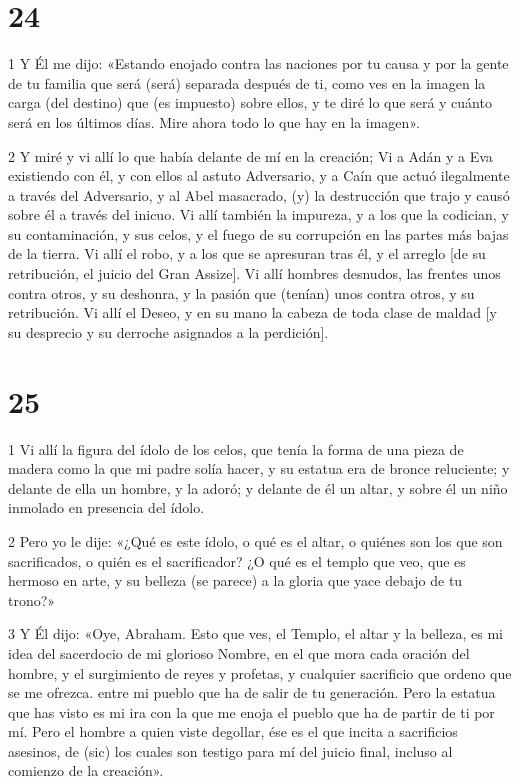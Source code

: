 \chapter{24}

\par 1 Y Él me dijo: «Estando enojado contra las naciones por tu causa y por la gente de tu familia que será (será) separada después de ti, como ves en la imagen la carga (del destino) que (es impuesto) sobre ellos, y te diré lo que será y cuánto será en los últimos días. Mire ahora todo lo que hay en la imagen».

\par 2 Y miré y vi allí lo que había delante de mí en la creación; Vi a Adán y a Eva existiendo con él, y con ellos al astuto Adversario, y a Caín que actuó ilegalmente a través del Adversario, y al Abel masacrado, (y) la destrucción que trajo y causó sobre él a través del inicuo. Vi allí también la impureza, y a los que la codician, y su contaminación, y sus celos, y el fuego de su corrupción en las partes más bajas de la tierra. Vi allí el robo, y a los que se apresuran tras él, y el arreglo [de su retribución, el juicio del Gran Assize]. Vi allí hombres desnudos, las frentes unos contra otros, y su deshonra, y la pasión que (tenían) unos contra otros, y su retribución. Vi allí el Deseo, y en su mano la cabeza de toda clase de maldad [y su desprecio y su derroche asignados a la perdición].

\chapter{25}

\par 1 Vi allí la figura del ídolo de los celos, que tenía la forma de una pieza de madera como la que mi padre solía hacer, y su estatua era de bronce reluciente; y delante de ella un hombre, y la adoró; y delante de él un altar, y sobre él un niño inmolado en presencia del ídolo.

\par 2 Pero yo le dije: «¿Qué es este ídolo, o qué es el altar, o quiénes son los que son sacrificados, o quién es el sacrificador? ¿O qué es el templo que veo, que es hermoso en arte, y su belleza (se parece) a la gloria que yace debajo de tu trono?»

\par 3 Y Él dijo: «Oye, Abraham. Esto que ves, el Templo, el altar y la belleza, es mi idea del sacerdocio de mi glorioso Nombre, en el que mora cada oración del hombre, y el surgimiento de reyes y profetas, y cualquier sacrificio que ordeno que se me ofrezca. entre mi pueblo que ha de salir de tu generación. Pero la estatua que has visto es mi ira con la que me enoja el pueblo que ha de partir de ti por mí. Pero el hombre a quien viste degollar, ése es el que incita a sacrificios asesinos, de (sic) los cuales son testigo para mí del juicio final, incluso al comienzo de la creación».

